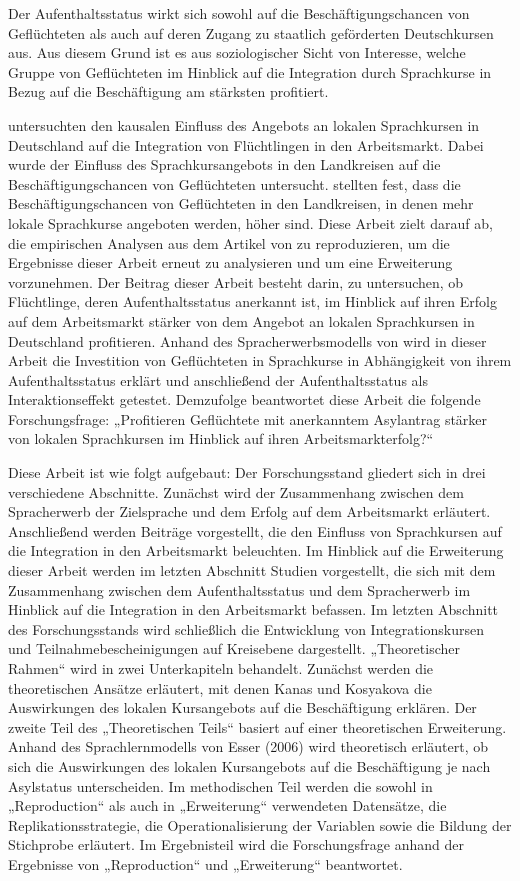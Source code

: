 Der Aufenthaltsstatus wirkt sich sowohl auf die Beschäftigungschancen von Geflüchteten als auch auf deren Zugang zu staatlich geförderten Deutschkursen aus. Aus diesem Grund ist es aus soziologischer Sicht von Interesse, welche Gruppe von Geflüchteten im Hinblick auf die Integration durch Sprachkurse in Bezug auf die Beschäftigung am stärksten profitiert.


\textcite{Kanas:2023} untersuchten den kausalen Einfluss des Angebots an lokalen Sprachkursen in Deutschland auf die Integration von Flüchtlingen in den Arbeitsmarkt. Dabei wurde der Einfluss des Sprachkursangebots in den Landkreisen auf die Beschäftigungschancen von Geflüchteten untersucht. \textcite{Kanas:2023} stellten fest, dass die Beschäftigungschancen von Geflüchteten in den Landkreisen, in denen mehr lokale Sprachkurse angeboten werden, höher sind. Diese Arbeit zielt darauf ab, die empirischen Analysen aus dem Artikel von \textcite{Kanas:2023} zu reproduzieren, um die Ergebnisse dieser Arbeit erneut zu analysieren und um eine Erweiterung vorzunehmen. Der Beitrag dieser Arbeit besteht darin, zu untersuchen, ob Flüchtlinge, deren Aufenthaltsstatus anerkannt ist, im Hinblick auf ihren Erfolg auf dem Arbeitsmarkt stärker von dem Angebot an lokalen Sprachkursen in Deutschland profitieren. Anhand des Spracherwerbsmodells von \textcite{Esser:2006} wird in dieser Arbeit die Investition von Geflüchteten in Sprachkurse in Abhängigkeit von ihrem Aufenthaltsstatus erklärt und anschließend der Aufenthaltsstatus als Interaktionseffekt getestet. Demzufolge beantwortet diese Arbeit die folgende Forschungsfrage: „Profitieren Geflüchtete mit anerkanntem Asylantrag stärker von lokalen Sprachkursen im Hinblick auf ihren Arbeitsmarkterfolg?“


Diese Arbeit ist wie folgt aufgebaut: Der Forschungsstand gliedert sich in drei verschiedene Abschnitte. Zunächst wird der Zusammenhang zwischen dem Spracherwerb der Zielsprache und dem Erfolg auf dem Arbeitsmarkt erläutert. Anschließend werden Beiträge vorgestellt, die den Einfluss von Sprachkursen auf die Integration in den Arbeitsmarkt beleuchten. Im Hinblick auf die Erweiterung dieser Arbeit werden im letzten Abschnitt Studien vorgestellt, die sich mit dem Zusammenhang zwischen dem Aufenthaltsstatus und dem Spracherwerb im Hinblick auf die Integration in den Arbeitsmarkt befassen. Im letzten Abschnitt des Forschungsstands wird schließlich die Entwicklung von Integrationskursen und Teilnahmebescheinigungen auf Kreisebene dargestellt. „Theoretischer Rahmen“ wird in zwei Unterkapiteln behandelt. Zunächst werden die theoretischen Ansätze erläutert, mit denen Kanas und Kosyakova die Auswirkungen des lokalen Kursangebots auf die Beschäftigung erklären. Der zweite Teil des „Theoretischen Teils“ basiert auf einer theoretischen Erweiterung. Anhand des Sprachlernmodells von Esser (2006) wird theoretisch erläutert, ob sich die Auswirkungen des lokalen Kursangebots auf die Beschäftigung je nach Asylstatus unterscheiden. Im methodischen Teil werden die sowohl in „Reproduction“ als auch in „Erweiterung“ verwendeten Datensätze, die Replikationsstrategie, die Operationalisierung der Variablen sowie die Bildung der Stichprobe erläutert. Im Ergebnisteil wird die Forschungsfrage anhand der Ergebnisse von „Reproduction“ und „Erweiterung“ beantwortet.
